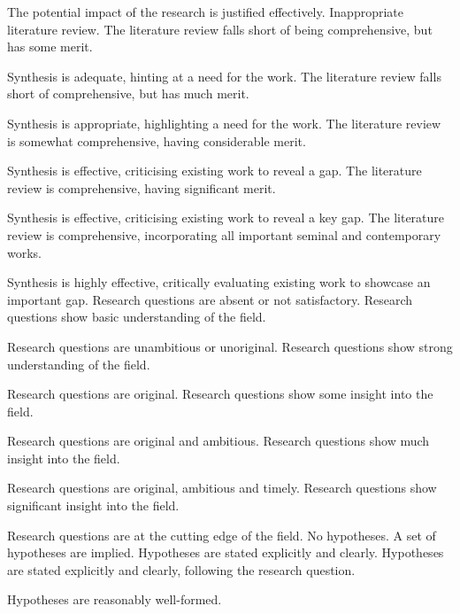 \begin{markingrubric}
        	\par The potential impact of the research is justified effectively.
%  		
        \grade \fail Inappropriate literature review.
        \grade The literature review falls short of being comprehensive, but has some merit.
        	\par  Synthesis is adequate, hinting at a need for the work.
        \grade The literature review falls short of comprehensive, but has much merit.
        	\par  Synthesis is appropriate, highlighting a need for the work.
        \grade The literature review is somewhat comprehensive, having considerable merit.
        	\par  Synthesis is effective, criticising existing work to reveal a gap.
        \grade The literature review is comprehensive, having significant merit.
        	\par Synthesis is effective, criticising existing work to reveal a key gap.
        \grade The literature review is comprehensive, incorporating all important seminal and contemporary works.
        	\par Synthesis is highly effective, critically evaluating existing work to showcase an important gap.
%
        \grade\fail 	Research questions are absent or not satisfactory.
        \grade 		Research questions show basic understanding of the field.
        \par		Research questions are unambitious or unoriginal.
        \grade 		Research questions show strong understanding of the field.
        \par		Research questions are original.
        \grade 		Research questions show some insight into the field.
        \par		Research questions are original and ambitious.
        \grade 		Research questions show much insight into the field.
        \par		Research questions are original, ambitious and timely.
        \grade 		Research questions show significant insight into the field.
        \par		Research questions are at the cutting edge of the field.
%        
            \grade\fail   No hypotheses.
        \grade 		A set of hypotheses are implied.
        \grade 		Hypotheses are stated explicitly and clearly.
        \grade 		Hypotheses are stated explicitly and clearly, following the research question.
        \par		Hypotheses are reasonably well-formed.

\end{markingrubric}
